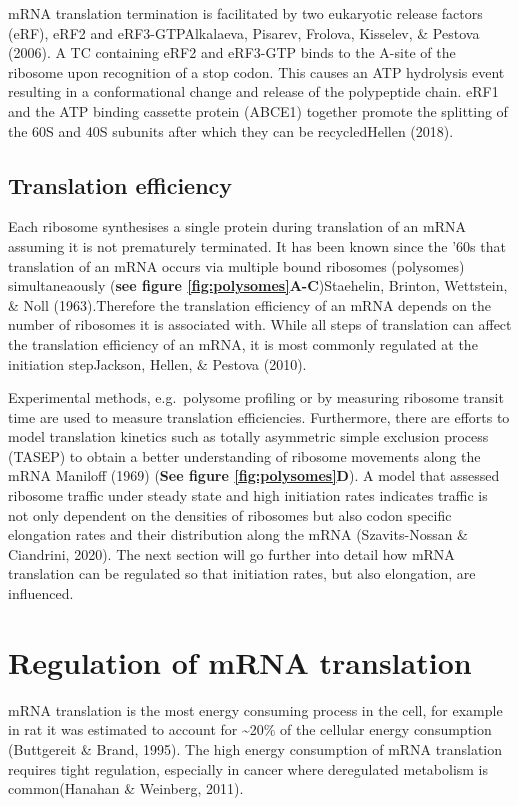 \documentclass[
  12pt,
  openany]{book}
\begin{document}
mRNA translation termination is facilitated by two eukaryotic release factors (eRF), eRF2 and eRF3-GTPAlkalaeva, Pisarev, Frolova, Kisselev, \& Pestova (2006). A TC containing eRF2 and eRF3-GTP binds to the A-site of the ribosome upon recognition of a stop codon. This causes an ATP hydrolysis event resulting in a conformational change and release of the polypeptide chain. eRF1 and the ATP binding cassette protein (ABCE1) together promote the splitting of the 60S and 40S subunits after which they can be recycledHellen (2018).

\subsection{Translation efficiency}

Each ribosome synthesises a single protein during translation of an mRNA assuming it is not prematurely terminated. It has been known since the '60s that translation of an mRNA occurs via multiple bound ribosomes (polysomes) simultaneaously (\textbf{see figure \ref{fig:polysomes}A-C})Staehelin, Brinton, Wettstein, \& Noll (1963).Therefore the translation efficiency of an mRNA depends on the number of ribosomes it is associated with. While all steps of translation can affect the translation efficiency of an mRNA, it is most commonly regulated at the initiation stepJackson, Hellen, \& Pestova (2010).

Experimental methods, e.g.~polysome profiling or by measuring ribosome transit time are used to measure translation efficiencies. Furthermore, there are efforts to model translation kinetics such as totally asymmetric simple exclusion process (TASEP) to obtain a better understanding of ribosome movements along the mRNA Maniloff (1969) (\textbf{See figure \ref{fig:polysomes}D}). A model that assessed ribosome traffic under steady state and high initiation rates indicates traffic is not only dependent on the densities of ribosomes but also codon specific elongation rates and their distribution along the mRNA (Szavits-Nossan \& Ciandrini, 2020). The next section will go further into detail how mRNA translation can be regulated so that initiation rates, but also elongation, are influenced.

\section{Regulation of mRNA translation} \label{regmRNA}

mRNA translation is the most energy consuming process in the cell, for example in rat it was estimated to account for \textasciitilde20\% of the cellular energy consumption (Buttgereit \& Brand, 1995). The high energy consumption of mRNA translation requires tight regulation, especially in cancer where deregulated metabolism is common(Hanahan \& Weinberg, 2011).
\end{document}
